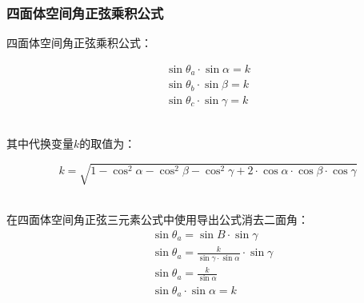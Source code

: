 \documentclass[UTF8]{ctexart}
\begin{document}
\subsubsection{四面体空间角正弦乘积公式}
    四面体空间角正弦乘积公式：
    \begin{large}
        \begin{align*}
            \sin{\theta_a}\cdot\sin{\alpha}=k\\[3mm]
            \sin{\theta_b}\cdot\sin{\beta}=k\\[3mm]
            \sin{\theta_c}\cdot\sin{\gamma}=k
        \end{align*}
    \end{large}\\
    其中代换变量$k$的取值为：\vspace{5pt}
    \begin{large}
        \begin{equation*}
            k=\sqrt{1-\cos^2{\alpha}-\cos^2{\beta}-\cos^2{\gamma}+2\cdot\cos{\alpha}\cdot\cos{\beta}\cdot\cos{\gamma}}
        \end{equation*}
    \end{large}\\[3mm]
    在四面体空间角正弦三元素公式中使用导出公式消去二面角：\vspace{5pt}
    \setcounter{equation}{0}
    \begin{align}
        &\sin{\theta_a}=\sin{B}\cdot\sin{\gamma}\\[3mm]
        &\sin{\theta_a}=\frac{k}{\sin{\gamma}\cdot\sin{\alpha}}\cdot\sin{\gamma}\\[3mm]
        &\sin{\theta_a}=\frac{k}{\sin{\alpha}}\\[3mm]
        &\sin{\theta_a}\cdot\sin{\alpha}=k
    \end{align}
\end{document}
